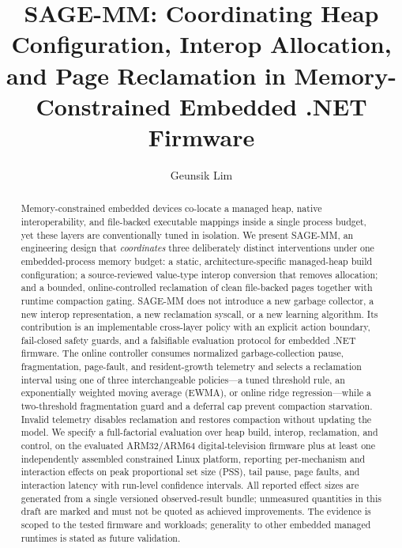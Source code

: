 \documentclass[acmsmall,screen]{acmart}
\begin{document}
\title{SAGE-MM: Coordinating Heap Configuration, Interop Allocation, and
Page Reclamation in Memory-Constrained Embedded .NET Firmware}

\author{Geunsik Lim}
\affiliation{%
  \institution{[Institution]}
  \city{[City]}
  \country{[Country]}
}

\renewcommand{\shortauthors}{Lim et al.}

\begin{abstract}
Memory-constrained embedded devices co-locate a managed heap, native
interoperability, and file-backed executable mappings inside a single
process budget, yet these layers are conventionally tuned in isolation.
We present SAGE-MM, an engineering design that \emph{coordinates} three
deliberately distinct interventions under one embedded-process memory
budget: a static, architecture-specific managed-heap build configuration;
a source-reviewed value-type interop conversion that removes allocation;
and a bounded, online-controlled reclamation of clean file-backed pages
together with runtime compaction gating. SAGE-MM does not introduce a new
garbage collector, a new interop representation, a new reclamation
syscall, or a new learning algorithm. Its contribution is an implementable
cross-layer policy with an explicit action boundary, fail-closed safety
guards, and a falsifiable evaluation protocol for embedded .NET firmware.
The online controller consumes normalized garbage-collection pause,
fragmentation, page-fault, and resident-growth telemetry and selects a
reclamation interval using one of three interchangeable policies---a tuned
threshold rule, an exponentially weighted moving average (EWMA), or online
ridge regression---while a two-threshold fragmentation guard and a
deferral cap prevent compaction starvation. Invalid telemetry disables
reclamation and restores compaction without updating the model. We specify
a full-factorial evaluation over heap build, interop, reclamation, and
control, on the evaluated ARM32/ARM64 digital-television firmware plus at
least one independently assembled constrained Linux platform, reporting
per-mechanism and interaction effects on peak proportional set size (PSS),
tail pause, page faults, and interaction latency with run-level confidence
intervals. All reported effect sizes are generated from a single versioned
observed-result bundle; unmeasured quantities in this draft are marked and
must not be quoted as achieved improvements. The evidence is scoped to the
tested firmware and workloads; generality to other embedded managed
runtimes is stated as future validation.
\end{abstract}
\end{document}
